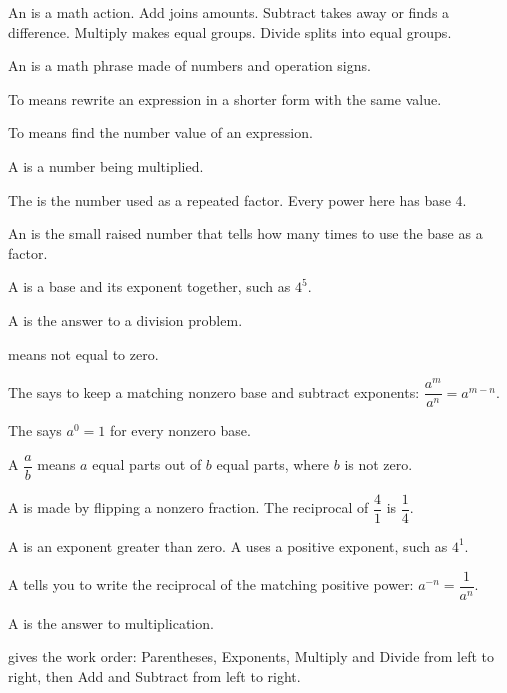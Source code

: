 \begin{words}
  \item An is a math action. Add joins amounts. Subtract takes
    away or finds a difference. Multiply makes equal groups. Divide splits into
    equal groups.
  \item An is a math phrase made of numbers and operation signs.
  \item To means rewrite an expression in a shorter form with the
    same value.
  \item To means find the number value of an expression.
  \item A is a number being multiplied.
  \item The is the number used as a repeated factor. Every power here
    has base 4.
  \item An is the small raised number that tells how many times to
    use the base as a factor.
  \item A is a base and its exponent together, such as $4^{5}$.
  \item A is the answer to a division problem.
  \item {}means not equal to zero.
  \item The says to keep a matching nonzero base and
    subtract exponents: $\dfrac{a^{m}}{a^{n}} = a^{m-n}$.
  \item The says $a^{0} = 1$ for every nonzero base.
  \item A $\dfrac{a}{b}$ means $a$ equal parts out of $b$ equal
    parts, where $b$ is not zero.
  \item A is made by flipping a nonzero fraction. The reciprocal
    of $\dfrac{4}{1}$ is $\dfrac{1}{4}$.
  \item A is an exponent greater than zero. A
    uses a positive exponent, such as $4^{1}$.
  \item A tells you to write the reciprocal of the
    matching positive power: $a^{-n} = \dfrac{1}{a^{n}}$.
  \item A is the answer to multiplication.
  \item {}gives the work order: Parentheses, Exponents, Multiply and
    Divide from left to right, then Add and Subtract from left to right.
\end{words}

